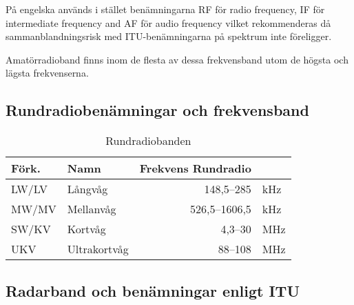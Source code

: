 På engelska används i stället be\-nämn\-ing\-ar\-na RF för radio frequency, IF
för intermediate frequency and AF för audio frequency vilket rekommenderas då
sammanblandningsrisk med ITU-be\-nämn\-ing\-ar\-na på spektrum inte
föreligger.

Amatörradioband finns inom de flesta av dessa frekvensband utom de högsta och
lägsta frekvenserna.

\subsection{Rundradiobenämningar och frekvensband}

\begin{table}[H]
\centering
\begin{tabular}{llrl}
\textbf{Förk.} & \textbf{Namn} & \textbf{Frekvens Rundradio} &     \\ \hline
LW/LV          & Långvåg       & 148,5--285                  & kHz \\
MW/MV          & Mellanvåg     & 526,5--1606,5               & kHz \\
SW/KV          & Kortvåg       & 4,3--30                     & MHz \\
UKV            & Ultrakortvåg  & 88--108                     & MHz \\
\end{tabular}
\caption{Rundradiobanden}
\end{table}

\subsection{Radarband och benämningar enligt ITU}

